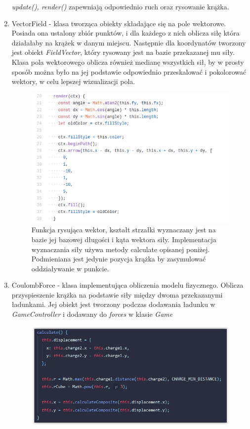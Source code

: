 \documentclass{article}
\begin{document}
\begin{enumerate}
   \textit{update(), render()} zapewniają odpowiednio ruch oraz rysowanie krążka.
   
   \clearpage
    \item VectorField - klasa tworząca obiekty składające się na pole wektorowe. Posiada ona ustalony zbiór punktów, i dla każdego z nich oblicza siłę która działałaby na krążek w danym miejscu. Następnie dla koordynatów tworzony jest obiekt \emph{FieldVector}, który rysowany jest na bazie przekazanej mu siły. Klasa pola wektorowego oblicza również medianę wszystkich sił, by w prosty sposób można było na jej podstawie odpowiednio przeskalować i pokolorować wektory, w celu lepszej wizualizacji pola.
    \begin{figure}[H]
        \centering
        \includegraphics[scale=0.5]{img/vector_drawing.png}
        \caption{Funkcja rysująca wektor, kształt strzałki wyznaczany jest na bazie jej bazowej długości i kąta wektora siły. Implementacja wyznaczania siły używa metody calculate opisanej poniżej. Podmieniana jest jedynie pozycja krążka by zasymulować oddziaływanie w punkcie. }
        \label{fig:vector_drawing}
    \end{figure}
    
   \clearpage
   \item CoulombForce - klasa implementująca obliczenia modelu fizycznego. Oblicza przyspieszenie krążka na podstawie siły między dwoma przekazanymi ładunkami. Jej obiekt jest tworzony podczas dodawania ładunku w \emph{GameController} i dodawany do \emph{forces} w klasie \emph{Game}
 
  
    \begin{figure}[H]
    \centering
    \includegraphics[scale=0.8]{img/Funkcja_calculate.PNG}


\end{figure}
\end{enumerate}
\end{document}
